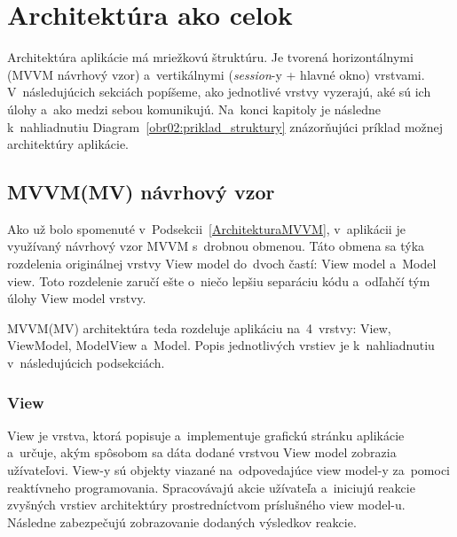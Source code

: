 \chapter{Architektúra ako celok}

Architektúra aplikácie má mriežkovú štruktúru. Je tvorená horizontálnymi (MVVM návrhový vzor) a~vertikálnymi (\textit{session}-y + hlavné okno) vrstvami. V~následujúcich sekciách popíšeme, ako jednotlivé vrstvy vyzerajú, aké sú ich úlohy a~ako medzi sebou komunikujú. Na~konci kapitoly je následne k~nahliadnutiu Diagram~\ref{obr02:priklad_struktury} znázorňujúci príklad možnej architektúry aplikácie.   

\section{MVVM(MV) návrhový vzor}\label{MVVMNavrhovyVzor}

Ako už bolo spomenuté v~Podsekcii~\ref{ArchitekturaMVVM}, v~aplikácii je využívaný návrhový vzor MVVM s~drobnou obmenou. Táto obmena sa týka rozdelenia originálnej vrstvy View model do~dvoch častí: View model a~Model view. Toto rozdelenie zaručí ešte o~niečo lepšiu separáciu kódu a~odľahčí tým úlohy View model vrstvy. 

MVVM(MV) architektúra teda rozdeluje aplikáciu na~4~vrstvy: View, ViewModel, ModelView a~Model. Popis jednotlivých vrstiev je k~nahliadnutiu v~následujúcich podsekciách. 

\subsection{View}

View je vrstva, ktorá popisuje a~implementuje grafickú stránku aplikácie a~určuje, akým spôsobom sa dáta dodané vrstvou View model zobrazia užívateľovi. View-y sú objekty viazané na~odpovedajúce view model-y za~pomoci reaktívneho programovania. Spracovávajú akcie užívateľa a~iniciujú reakcie zvyšných vrstiev architektúry prostredníctvom príslušného view model-u. Následne zabezpečujú zobrazovanie dodaných výsledkov reakcie.

